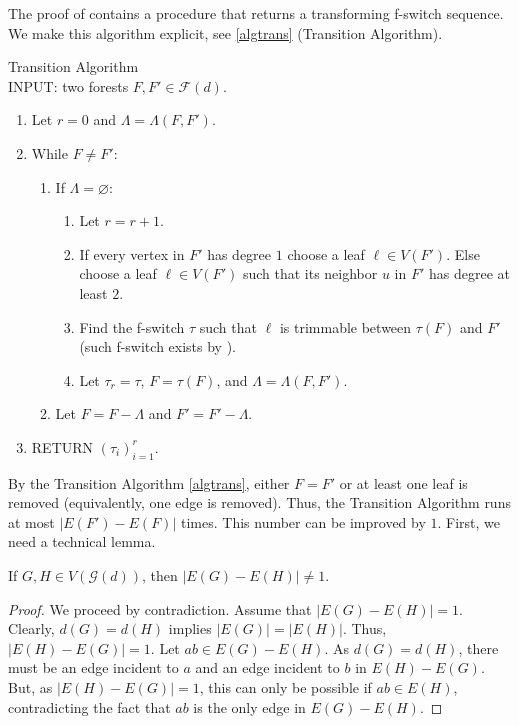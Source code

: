 \documentclass{BICA}
\begin{document}
The proof of  contains a procedure that returns a transforming f-switch sequence. We make this algorithm explicit, see \eqref{algtrans} (Transition Algorithm).
\begin{algorithm}[h]
	\label{algtrans}
	{Transition Algorithm}\\
	INPUT: two forests $F,F' \in \mathcal{F}(d)$.
	 \begin{enumerate}

		\item Let $r=0$ and $\Lambda=\Lambda(F,F')$.
		\item While \(F\neq F'\):
			\begin{enumerate}
			\item If $\Lambda=\varnothing$:
				\begin{enumerate}
					\item Let \(r=r+1\).
					\item If every vertex in $F'$ has degree $1$ choose a leaf \(\ell \in V(F')\). Else choose a leaf
					$\ell \in V(F')$ such that its neighbor \(u\) in \(F'\) has degree at least $2$.
					\item Find the f-switch \(\tau\) such that \(\ell\) is trimmable between \(\tau(F)\) and \(F'\) (such f-switch exists by ).
					\item Let \(\tau_{r}=\tau\), \(F=\tau(F)\), and $\Lambda=\Lambda(F,F')$.
				\end{enumerate}
			\item Let \(F=F-\Lambda\) and \(F'=F'-\Lambda\).
			\end{enumerate}
		\item RETURN \((\tau_{i})_{i=1}^{r}\).
	\end{enumerate}
\end{algorithm}
By the Transition Algorithm \eqref{algtrans}, either \(F=F'\) or at least one leaf is removed (equivalently, one edge is removed). Thus, the Transition Algorithm runs at most \(|E(F')-E(F)|\) times. This number can be improved by $1$. First, we need a technical lemma.

\begin{lemma}
	\label{etaneq1}
	If \(G,H \in V(\mathcal{G}(d))\), then \(| E(G) - E(H)|\neq 1\).
\end{lemma}
\begin{proof}
We proceed by contradiction. Assume that \(| E(G) - E(H)|= 1\). Clearly, $d(G)=d(H)$ implies $|E(G)|=|E(H)|$. Thus, $|E(H) - E(G)|= 1$. Let $ab\in E(G)-E(H)$. As $d(G)=d(H)$, there must be an edge incident to $a$ and an edge incident to $b$ in $E(H)-E(G)$. But, as $|E(H) - E(G)|= 1$, this can only be possible if $ab\in E(H)$, contradicting the fact that $ab$ is the only edge in $E(G)-E(H)$.
\end{proof}
\end{document}

